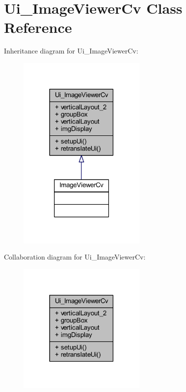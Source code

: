 \hypertarget{class_ui___image_viewer_cv}{}\section{Ui\+\_\+\+Image\+Viewer\+Cv Class Reference}
\label{class_ui___image_viewer_cv}


Inheritance diagram for Ui\+\_\+\+Image\+Viewer\+Cv\+:
\nopagebreak
\begin{figure}[H]
\begin{center}
\leavevmode
\includegraphics[width=177pt]{class_ui___image_viewer_cv__inherit__graph}
\end{center}
\end{figure}


Collaboration diagram for Ui\+\_\+\+Image\+Viewer\+Cv\+:
\nopagebreak
\begin{figure}[H]
\begin{center}
\leavevmode
\includegraphics[width=177pt]{class_ui___image_viewer_cv__coll__graph}
\end{center}
\end{figure}
